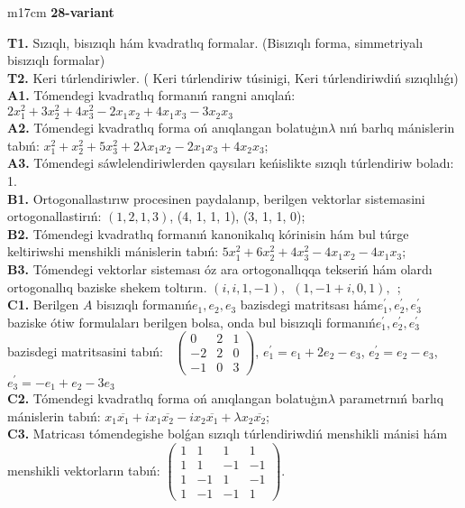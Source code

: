 \documentclass{article}
\begin{document}
\begin{tabular}{m{17cm}}
\textbf{28-variant}
\newline

\textbf{T1.} Sızıqlı, bisızıqlı hám kvadratlıq formalar. (Bisızıqlı forma,  simmetriyalı bisızıqlı formalar)  \\
\textbf{T2.} Keri túrlendiriwler. ( Keri túrlendiriw túsinigi,   Keri túrlendiriwdiń sızıqlılıǵı) \\
\textbf{A1.} Tómendegi kvadratlıq formanıń rangni anıqlań: \(2x_{1}^{2} + 3x_{2}^{2} + 4x_{3}^{2} - 2x_{1}x_{2} + 4x_{1}x_{3} - 3x_{2}x_{3}\) \\
\textbf{A2.} Tómendegi kvadratlıq forma oń anıqlangan bolatuģın\(\lambda\) nıń barlıq mánislerin tabıń: \(x_{1}^{2} + x_{2}^{2} + 5x_{3}^{2} + 2\lambda x_{1}x_{2} - 2x_{1}x_{3} + 4x_{2}x_{3}\); \\
\textbf{A3.} Tómendegi sáwlelendiriwlerden qaysıları keńislikte sızıqlı túrlendiriw boladı: 1. \\
\textbf{B1.} Ortogonallastırıw procesinen paydalanıp, berilgen vektorlar sistemasini ortogonallastirıń: \((1,2,1,3)\), (4, 1, 1, 1), (3, 1, 1, 0); \\
\textbf{B2.} Tómendegi kvadratlıq formanıń kanonikalıq kórinisin hám bul túrge keltiriwshi menshikli mánislerin tabıń: \(5x_{1}^{2} + 6x_{2}^{2} + 4x_{3}^{2} - 4x_{1}x_{2} - 4x_{1}x_{3}\); \\
\textbf{B3.} Tómendegi vektorlar sisteması óz ara ortogonallıqqa tekseriń hám olardı ortogonallıq baziske shekem toltırın. \((i,i,1, - 1),\ \ (1, - 1 + i,0,1),\ \ \); \\
\textbf{C1.} Berilgen \(A\) bisızıqlı formanıń\(e_{1},e_{2},e_{3}\) bazisdegi matritsası hám\(e_{1}^{'},e_{2}^{'},e_{3}^{'}\) baziske ótiw formulaları berilgen bolsa, onda bul bisızıqli formanıń\(e_{1}^{'},e_{2}^{'},e_{3}^{'}\) bazisdegi matritsasini tabıń: \(\ \) \(\begin{pmatrix} 0 & 2 & 1 \\  - 2 & 2 & 0 \\  - 1 & 0 & 3 \end{pmatrix}\), \(e_{1}^{'} = e_{1} + 2e_{2} - e_{3}\), \(e_{2}^{'} = e_{2} - e_{3}\), \(e_{3}^{'} = - e_{1} + e_{2} - 3e_{3}\) \\
\textbf{C2.} Tómendegi kvadratlıq forma oń anıqlangan bolatuģın\(\lambda\) parametrnıń barlıq mánislerin tabıń: \(x_{1}\overline{x_{1}} + ix_{1}\overline{x_{2}} - ix_{2}\overline{x_{1}} + \lambda x_{2}\overline{x_{2}}\); \\
\textbf{C3.} Matricası tómendegishe bolǵan sızıqlı túrlendiriwdiń menshikli mánisi hám menshikli vektorların tabıń: \(\begin{pmatrix} 1 & 1 & 1 & 1 \\ 1 & 1 & - 1 & - 1 \\ 1 & - 1 & 1 & - 1 \\ 1 & - 1 & - 1 & 1 \end{pmatrix}\). \\

\end{tabular}
\vspace{1cm}
\end{document}
